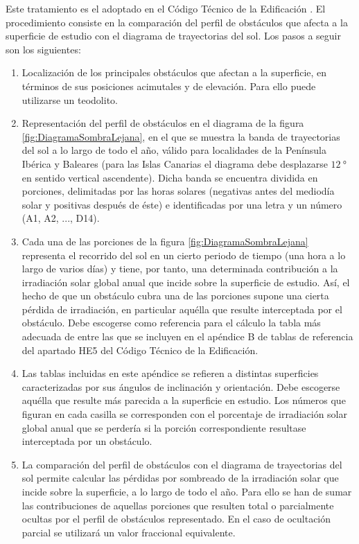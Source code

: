 Este tratamiento es el adoptado en el Código Técnico de la Edificación
\citep{CodigoTecnico2006}. El procedimiento consiste en la comparación
del perfil de obstáculos que afecta a la superficie de estudio con
el diagrama de trayectorias del sol. Los pasos a seguir son los siguientes: 
\begin{enumerate}
\item Localización de los principales obstáculos que afectan a la superficie,
en términos de sus posiciones acimutales y de elevación. Para ello
puede utilizarse un teodolito.
\item Representación del perfil de obstáculos en el diagrama de la figura
\ref{fig:DiagramaSombraLejana}, en el que se muestra la banda de
trayectorias del sol a lo largo de todo el año, válido para localidades
de la Península Ibérica y Baleares (para las Islas Canarias el diagrama
debe desplazarse $\SI{12}{\degree}$ en sentido vertical ascendente).
Dicha banda se encuentra dividida en porciones, delimitadas por las
horas solares (negativas antes del mediodía solar y positivas después
de éste) e identificadas por una letra y un número (A1, A2, ..., D14).
\item Cada una de las porciones de la figura \ref{fig:DiagramaSombraLejana}
representa el recorrido del sol en un cierto periodo de tiempo (una
hora a lo largo de varios días) y tiene, por tanto, una determinada
contribución a la irradiación solar global anual que incide sobre
la superficie de estudio. Así, el hecho de que un obstáculo cubra
una de las porciones supone una cierta pérdida de irradiación, en
particular aquélla que resulte interceptada por el obstáculo. Debe
escogerse como referencia para el cálculo la tabla más adecuada de
entre las que se incluyen en el apéndice B de tablas de referencia
del apartado HE5 del Código Técnico de la Edificación. 
\item Las tablas incluidas en este apéndice se refieren a distintas superficies
caracterizadas por sus ángulos de inclinación y orientación. Debe
escogerse aquélla que resulte más parecida a la superficie en estudio.
Los números que figuran en cada casilla se corresponden con el porcentaje
de irradiación solar global anual que se perdería si la porción correspondiente
resultase interceptada por un obstáculo. 
\item La comparación del perfil de obstáculos con el diagrama de trayectorias
del sol permite calcular las pérdidas por sombreado de la irradiación
solar que incide sobre la superficie, a lo largo de todo el año. Para
ello se han de sumar las contribuciones de aquellas porciones que
resulten total o parcialmente ocultas por el perfil de obstáculos
representado. En el caso de ocultación parcial se utilizará un valor
fraccional equivalente.
\end{enumerate}
